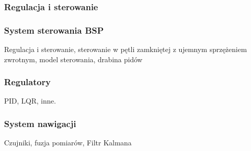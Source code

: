 \subsubsection{Regulacja i sterowanie}

\subsubsection{System sterowania BSP}
Regulacja i sterowanie, sterowanie w pętli zamkniętej z ujemnym sprzężeniem zwrotnym, model sterowania, drabina pidów
\subsubsection{Regulatory}
PID, LQR, inne.
\subsubsection{System nawigacji}
Czujniki, fuzja pomiarów, Filtr Kalmana


